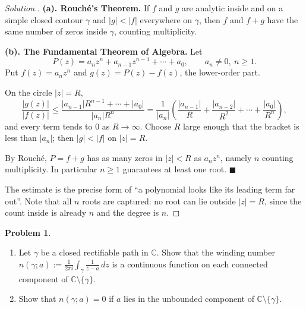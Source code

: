 \documentclass[11pt,a4paper]{article}
\theoremstyle{definition}
\newtheorem{problemx}{Problem}[section]
\newenvironment{problem}{\begin{problemx}}{\end{problemx}}
\newenvironment{solution}
  {\renewcommand{\qedsymbol}{}\begin{proof}[\textit{Solution}.]}
  {\end{proof}}
\begin{document}
\begin{solution}
\textbf{(a). Rouch\'e's Theorem.} If $f$ and $g$ are analytic inside and on a
simple closed contour $\gamma$ and $\left|g\right| < \left|f\right|$ everywhere on
$\gamma$, then $f$ and $f+g$ have the same number of zeros inside $\gamma$,
counting multiplicity.

\textbf{(b). The Fundamental Theorem of Algebra.} Let
$$P(z) = a_n z^{n} + a_{n-1}z^{n-1} + \cdots + a_0,
\qquad a_n \neq 0,\ n \geq 1 .$$
Put $f(z) = a_n z^{n}$ and $g(z) = P(z) - f(z)$, the lower-order part.

On the circle $\left|z\right| = R$,
$$\frac{\left|g(z)\right|}{\left|f(z)\right|}
\leq \frac{\left|a_{n-1}\right|R^{n-1} + \cdots + \left|a_0\right|}
{\left|a_n\right| R^{n}}
= \frac{1}{\left|a_n\right|}\left(\frac{\left|a_{n-1}\right|}{R}
+ \frac{\left|a_{n-2}\right|}{R^{2}} + \cdots
+ \frac{\left|a_{0}\right|}{R^{n}}\right),$$
and every term tends to $0$ as $R \rightarrow \infty$. Choose $R$ large enough
that the bracket is less than $\left|a_n\right|$; then
$\left|g\right| < \left|f\right|$ on $\left|z\right| = R$.

By Rouch\'e, $P = f + g$ has as many zeros in $\left|z\right| < R$ as
$a_n z^{n}$, namely $n$ counting multiplicity. In particular $n \geq 1$ guarantees
at least one root. $\blacksquare$

The estimate is the precise form of ``a polynomial looks like its leading term
far out''. Note that all $n$ roots are captured: no root can lie outside
$\left|z\right| = R$, since the count inside is already $n$ and the degree
is $n$.
\end{solution}


\begin{problem}
\begin{enumerate}
\item[(a).] Let $\gamma$ be a closed rectifiable path in $\mathbb{C}$. Show that
the winding number
$n(\gamma; a) := \frac{1}{2\pi i}\displaystyle\int_{\gamma}\frac{1}{z - a}\,dz$
is a continuous function on each connected component of
$\mathbb{C}\setminus\{\gamma\}$.
\item[(b).] Show that $n(\gamma; a) = 0$ if $a$ lies in the unbounded component
of $\mathbb{C}\setminus\{\gamma\}$.
\end{enumerate}
\end{problem}
\end{document}
